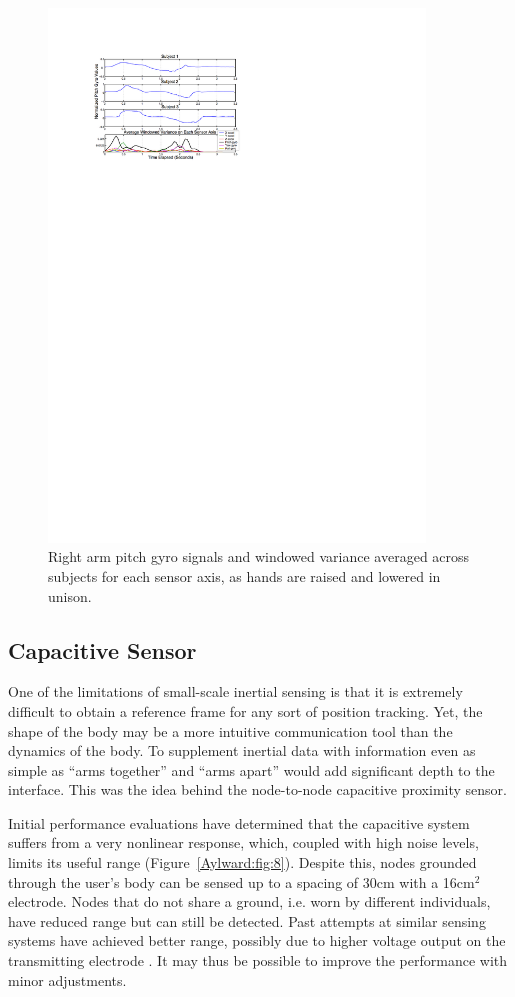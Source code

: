 \begin{figure}[t]
\centering
\includegraphics[width=100mm]{jp_fig7} 
\caption{Right arm pitch gyro signals and windowed variance averaged
across subjects for each sensor axis, as hands are raised and lowered in unison.}
\label{Aylward:fig:7} 
\end{figure}

\subsection{Capacitive Sensor}


One of the limitations of small-scale inertial sensing is that it is extremely
difficult to obtain a reference frame for any sort of position tracking. Yet, the
shape of the body may be a more intuitive communication tool than the dynamics of
the body.  To supplement inertial data with information even as simple as ``arms
together'' and ``arms apart'' would add significant depth to the interface. This
was the idea behind the node-to-node capacitive proximity sensor.

Initial performance evaluations have determined that the capacitive system
suffers from a very nonlinear response, which, coupled with high noise levels,
limits its useful range (Figure~\ref{Aylward:fig:8}). Despite this, nodes grounded through the user's
body can be sensed up to a spacing of 30cm with a 16cm$^{2}$ electrode. Nodes
that do not share a ground, i.e. worn by different individuals, have reduced
range but can still be detected. Past attempts at similar sensing systems have
achieved better range, possibly due to higher voltage output on the transmitting
electrode \cite{Paradiso:1997b,Smith:1999}. It may thus be possible to improve the performance with minor
adjustments.

